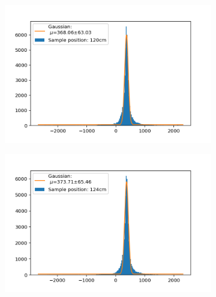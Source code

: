 \documentclass[]{article}
\begin{document}
\begin{figure}[H]
\centering
\medskip
\begin{subfigure}{0.48\textwidth}
\includegraphics[width=\linewidth]{Plots/Pos/120cm.png}
\end{subfigure}
\begin{subfigure}[c]{0.48\linewidth}
\includegraphics[width=\linewidth]{Plots/Pos/124cm.png}
\end{subfigure}


\end{figure}
\end{document}
